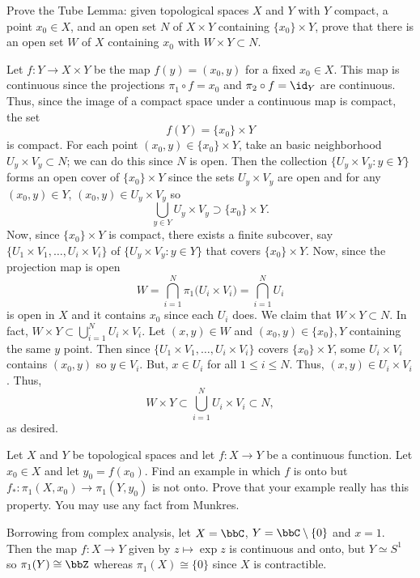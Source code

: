 \begin{problem}
  Prove the Tube Lemma: given topological spaces \(X\) and \(Y\) with \(Y\)
  compact, a point \(x_0\in X\), and an open set \(N\) of \(X\times Y\)
  containing \(\{x_0\}\times Y\), prove that there is an open set \(W\) of
  \(X\) containing \(x_0\) with \(W\times Y\subset N\).
\end{problem}
\begin{solution}
  Let \(f\colon Y\to X\times Y\) be the map \(f(y)=(x_0,y)\) for a fixed
  \(x_0\in X\). This map is continuous since the projections
  \(\pi_1\circ f=x_0\) and \(\pi_2\circ f=\id_Y\) are continuous. Thus,
  since the image of a compact space under a continuous map is compact, the
  set
  \[
    f(Y)=\{x_0\}\times Y
  \]
  is compact. For each point \((x_0,y)\in \{x_0\}\times Y\), take an basic
  neighborhood \(U_y\times V_y\subset N\); we can do this since \(N\) is
  open. Then the collection \(\bigl\{U_y\times V_y:y\in Y\bigr\}\) forms an
  open cover of \(\{x_0\}\times Y\) since the sets \(U_y\times V_y\) are
  open and for any \((x_0,y)\in Y\), \((x_0,y)\in U_y\times V_y\) so
  \[
    \bigcup_{y\in Y}U_y\times V_y\supset \{x_0\}\times Y.
  \]
  Now, since \(\{x_0\}\times Y\) is compact, there exists a finite
  subcover, say \(\bigl\{U_1\times V_1,\dotsc,U_i\times V_i\bigr\}\) of
  \(\bigl\{U_y\times V_y:y\in Y\bigr\}\) that covers \(\{x_0\}\times
  Y\). Now, since the projection map is open
  \[
    W=\bigcap_{i=1}^N\pi_1\bigl(U_i\times V_i\bigr)=\bigcap_{i=1}^NU_i
  \]
  is open in \(X\) and it contains \(x_0\) since each \(U_i\) does. We
  claim that \(W\times Y\subset N\). In fact, \(W\times
  Y\subset\bigcup_{i=1}^N U_i\times V_i\). Let \((x,y)\in W\) and
  \((x_0,y)\in\{x_0\},Y\) containing the same \(y\) point. Then since
  \(\bigl\{U_1\times V_1,\dotsc,U_i\times V_i\bigr\}\) covers
  \(\{x_0\}\times Y\), some \(U_i\times V_i\) contains \((x_0,y)\) so
  \(y\in V_i\). But, \(x\in U_i\) for all \(1\leq i\leq N\). Thus,
  \((x,y)\in U_i\times V_i\). Thus,
  \[
    W\times Y\subset\bigcup_{i=1}^N U_i\times V_i\subset N,
  \]
  as desired.
\end{solution}

\begin{problem}
  Let \(X\) and \(Y\) be topological spaces and let \(f\colon X\to Y\) be a
  continuous function. Let \(x_0\in X\) and let \(y_0=f(x_0)\). Find an
  example in which \(f\) is onto but
  \(f_*\colon\pi_1(X,x_0)\to\pi_1(Y,y_0)\) is not onto. Prove that your
  example really has this property. You may use any fact from Munkres.
\end{problem}
\begin{solution}
  Borrowing from complex analysis, let \(X=\bbC\), \(Y=\bbC\setminus\{0\}\)
  and \(x=1\). Then the map \(f\colon X\to Y\) given by \(z\mapsto \exp z\)
  is continuous and onto, but \(Y\simeq S^1\) so \(\pi_1(Y)\cong\bbZ\)
  whereas \(\pi_1(X)\cong\{0\}\) since \(X\) is contractible.
\end{solution}

